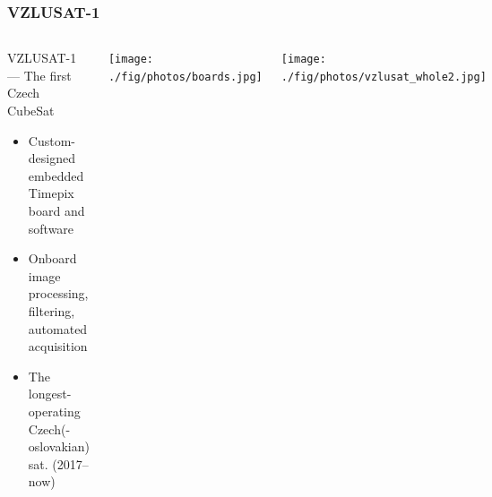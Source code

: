 \documentclass[aspectratio=169]{beamer}
\begin{document}


\begin{frame}
\frametitle{VZLUSAT-1}


\begin{columns}[c]


\begin{block}{VZLUSAT-1 --- The first Czech CubeSat \cite{urban2017vzlusat, baca2016miniaturized}}
  \begin{itemize}
    \item \small Custom-designed embedded Timepix board and software \cite{baca2016miniaturized}
    \item \small Onboard image processing, filtering, automated acquisition
    \item \small The longest-operating Czech(-oslovakian) sat. (2017--now)
  \end{itemize}
\end{block}

\texttt{[image: ./fig/photos/boards.jpg]}


\centering
\texttt{[image: ./fig/photos/vzlusat\_whole2.jpg]}

\end{columns}

\end{frame}
\end{document}
